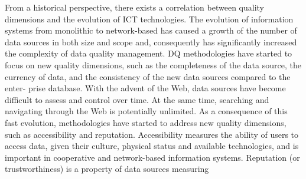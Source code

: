 \documentclass[pdftex,english,oribibl]{llncs}
\begin{document}
From a historical perspective, there exists a correlation between quality dimensions and the evolution of ICT technologies.
The evolution of information systems from monolithic to network-based has caused a growth of the number of data sources in both size and scope and, consequently has significantly increased the complexity of data quality management. DQ methodologies have started to focus on new quality dimensions, such as the completeness of the data source, the currency of data, and the consistency of the new data sources compared to the enter- prise database. With the advent of the Web, data sources have become difficult to assess and control over time. At the same time, searching and navigating through the Web is potentially unlimited. As a consequence of this fast evolution, methodologies have started to address new quality dimensions, such as accessibility and reputation. Accessibility measures the ability of users to access data, given their culture, physical status and available technologies, and is important in cooperative and network-based information systems. Reputation (or trustworthiness) is a property of data sources measuring
\end{document}
